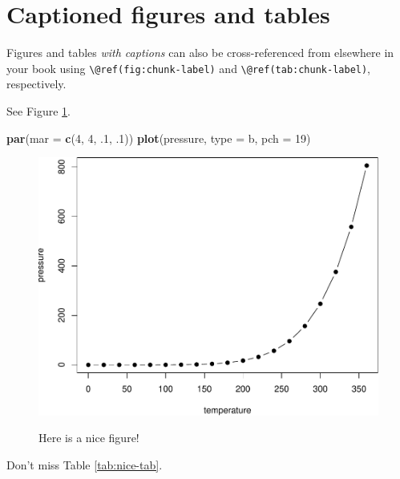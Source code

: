 \documentclass[
]{book}
\newenvironment{Shaded}{\begin{snugshade}}{\end{snugshade}}
\newcommand{\AttributeTok}[1]{\textcolor[rgb]{0.13,0.29,0.53}{#1}}
\newcommand{\DecValTok}[1]{\textcolor[rgb]{0.00,0.00,0.81}{#1}}
\newcommand{\FunctionTok}[1]{\textcolor[rgb]{0.13,0.29,0.53}{\textbf{#1}}}
\newcommand{\NormalTok}[1]{#1}
\newcommand{\StringTok}[1]{\textcolor[rgb]{0.31,0.60,0.02}{#1}}
\theoremstyle{definition}
\theoremstyle{definition}
\theoremstyle{definition}
\theoremstyle{definition}
\theoremstyle{remark}
\begin{document}
\section{Captioned figures and tables}\label{captioned-figures-and-tables}

Figures and tables \emph{with captions} can also be cross-referenced from elsewhere in your book using \texttt{\textbackslash{}@ref(fig:chunk-label)} and \texttt{\textbackslash{}@ref(tab:chunk-label)}, respectively.

See Figure \ref{fig:nice-fig}.

\begin{Shaded}
\begin{Highlighting}[]
\FunctionTok{par}\NormalTok{(}\AttributeTok{mar =} \FunctionTok{c}\NormalTok{(}\DecValTok{4}\NormalTok{, }\DecValTok{4}\NormalTok{, .}\DecValTok{1}\NormalTok{, .}\DecValTok{1}\NormalTok{))}
\FunctionTok{plot}\NormalTok{(pressure, }\AttributeTok{type =} \StringTok{\textquotesingle{}b\textquotesingle{}}\NormalTok{, }\AttributeTok{pch =} \DecValTok{19}\NormalTok{)}
\end{Highlighting}
\end{Shaded}

\begin{figure}

{\centering \includegraphics[width=0.8\linewidth,alt={Plot with connected points showing that vapor pressure of mercury increases exponentially as temperature increases.}]{_main_files/figure-latex/nice-fig-1} 

}

\caption{Here is a nice figure!}\label{fig:nice-fig}
\end{figure}

Don't miss Table \ref{tab:nice-tab}.
\end{document}
